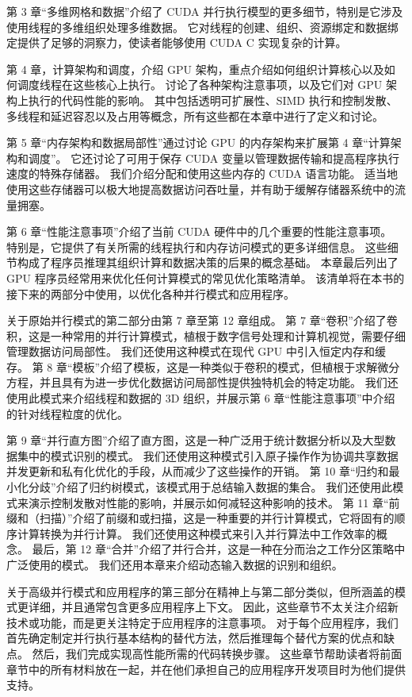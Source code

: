 第 3 章“多维网格和数据”介绍了 CUDA 并行执行模型的更多细节，特别是它涉及使用线程的多维组织处理多维数据。 它对线程的创建、组织、资源绑定和数据绑定提供了足够的洞察力，使读者能够使用 CUDA C 实现复杂的计算。

第 4 章，计算架构和调度，介绍 GPU 架构，重点介绍如何组织计算核心以及如何调度线程在这些核心上执行。 讨论了各种架构注意事项，以及它们对 GPU 架构上执行的代码性能的影响。 其中包括透明可扩展性、SIMD 执行和控制发散、多线程和延迟容忍以及占用等概念，所有这些都在本章中进行了定义和讨论。

第 5 章“内存架构和数据局部性”通过讨论 GPU 的内存架构来扩展第 4 章“计算架构和调度”。 它还讨论了可用于保存 CUDA 变量以管理数据传输和提高程序执行速度的特殊存储器。 我们介绍分配和使用这些内存的 CUDA 语言功能。 适当地使用这些存储器可以极大地提高数据访问吞吐量，并有助于缓解存储器系统中的流量拥塞。

第 6 章“性能注意事项”介绍了当前 CUDA 硬件中的几个重要的性能注意事项。 特别是，它提供了有关所需的线程执行和内存访问模式的更多详细信息。 这些细节构成了程序员推理其组织计算和数据决策的后果的概念基础。 本章最后列出了 GPU 程序员经常用来优化任何计算模式的常见优化策略清单。 该清单将在本书的接下来的两部分中使用，以优化各种并行模式和应用程序。

关于原始并行模式的第二部分由第 7 章至第 12 章组成。 第 7 章“卷积”介绍了卷积，这是一种常用的并行计算模式，植根于数字信号处理和计算机视觉，需要仔细管理数据访问局部性。 我们还使用这种模式在现代 GPU 中引入恒定内存和缓存。 第 8 章“模板”介绍了模板，这是一种类似于卷积的模式，但植根于求解微分方程，并且具有为进一步优化数据访问局部性提供独特机会的特定功能。 我们还使用此模式来介绍线程和数据的 3D 组织，并展示第 6 章“性能注意事项”中介绍的针对线程粒度的优化。

第 9 章“并行直方图”介绍了直方图，这是一种广泛用于统计数据分析以及大型数据集中的模式识别的模式。 我们还使用这种模式引入原子操作作为协调共享数据并发更新和私有化优化的手段，从而减少了这些操作的开销。 第 10 章“归约和最小化分歧”介绍了归约树模式，该模式用于总结输入数据的集合。 我们还使用此模式来演示控制发散对性能的影响，并展示如何减轻这种影响的技术。 第 11 章“前缀和（扫描）”介绍了前缀和或扫描，这是一种重要的并行计算模式，它将固有的顺序计算转换为并行计算。 我们还使用这种模式来引入并行算法中工作效率的概念。 最后，第 12 章“合并”介绍了并行合并，这是一种在分而治之工作分区策略中广泛使用的模式。 我们还用本章来介绍动态输入数据的识别和组织。

关于高级并行模式和应用程序的第三部分在精神上与第二部分类似，但所涵盖的模式更详细，并且通常包含更多应用程序上下文。 因此，这些章节不太关注介绍新技术或功能，而是更关注特定于应用程序的注意事项。 对于每个应用程序，我们首先确定制定并行执行基本结构的替代方法，然后推理每个替代方案的优点和缺点。 然后，我们完成实现高性能所需的代码转换步骤。 这些章节帮助读者将前面章节中的所有材料放在一起，并在他们承担自己的应用程序开发项目时为他们提供支持。

